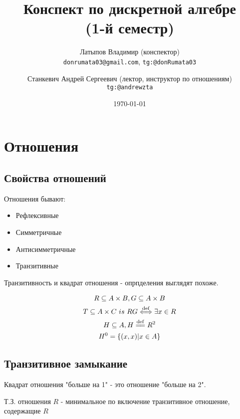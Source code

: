 \documentclass[a4paper, 12pt]{article}
\title{Конспект по дискретной алгебре \\(1-й семестр)}
\author{
  Латыпов Владимир (конспектор)\\
  \texttt{donrumata03@gmail.com}, \texttt{tg:@donRumata03}
  \and
  Станкевич Андрей Сергеевич (лектор, инструктор по отношениям)\\
  \texttt{tg:@andrewzta}
}
\date{\today}
\begin{document}
    \maketitle
    \newpage
    \tableofcontents
    \newpage


    \section{Отношения}

    \subsection{Свойства отношений}

    Отношения бывают:
    \begin{itemize}
        \item Рефлексивные
        \item Симметричные
        \item Антисимметричные
        \item Транзитивные
    \end{itemize}

    Транзитивность и квадрат отношения - опрпделения выглядят похоже.

    \begin{definition}
        \begin{gather}
            R \subseteq A \times B, G \subseteq A \times B\\
            T \subseteq A \times C ~ is ~ RG \isdef \exists x \in R \\
            H \subseteq A, H \eqdef R^2 \\
            H^0 = \{ (x, x) | x \in A \}
        \end{gather}
    \end{definition}
 
    
    \subsection{Транзитивное замыкание}

    \begin{note}
        Квадрат отношения "больше на 1" - это отношение "больше на 2".
    \end{note}

    \begin{definition}\nl
        Т.З. отношения $R$ - минимальное 
        по включение транзитивное отношение, содержащие $R$
    \end{definition}
\end{document}
